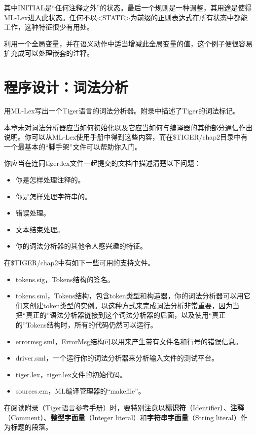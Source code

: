 \documentclass[cn,11pt,chinese]{elegantbook}
\begin{document}
其中INITIAL是“任何注释之外”的状态。最后一个规则是一种调整，其用途是使得ML-Lex进入此状态。任何不以<STATE>为前缀的正则表达式在所有状态中都能工作，这种特征很少有用处。

利用一个全局变量，并在语义动作中适当增减此全局变量的值，这个例子便很容易扩充成可以处理嵌套的注释。

\section{程序设计：词法分析}

用ML-Lex写出一个Tiger语言的词法分析器。附录中描述了Tiger的词法标记。

本章未对词法分析器应当如何初始化以及它应当如何与编译器的其他部分通信作出说明。你可以从ML-Lex使用手册中得到这些内容，而在\$TIGER/chap2目录中有一个最基本的“脚手架”文件可以帮助你入门。

你应当在连同tiger.lex文件一起提交的文档中描述清楚以下问题：

\begin{itemize}
  \item 你是怎样处理注释的。
  \item 你是怎样处理字符串的。
  \item 错误处理。
  \item 文本结束处理。
  \item 你的词法分析器的其他令人感兴趣的特征。
\end{itemize}

在\$TIGER/chap2中有如下一些可用的支持文件。

\begin{itemize}
  \item tokens.sig，Tokens结构的签名。
  \item tokens.sml，Tokens结构，包含token类型和构造器，你的词法分析器可以用它们来创建token类型的实例。以这种方式来完成词法分析非常重要，因为当把“真正的”语法分析器链接到这个词法分析器的后面，以及使用“真正的”Tokens结构时，所有的代码仍然可以运行。
  \item errormsg.sml，ErrorMsg结构可以用来产生带有文件名和行号的错误信息。
  \item driver.sml，一个运行你的词法分析器来分析输入文件的测试平台。
  \item tiger.lex，tiger.lex文件的初始代码。
  \item sources.cm，ML编译管理器的“makefile”。
\end{itemize}

在阅读附录（Tiger语言参考手册）时，要特别注意以\textbf{标识符}（Identifier）、\textbf{注释}（Comment）、\textbf{整型字面量}（Integer literal）和\textbf{字符串字面量}（String literal）作为标题的段落。
\end{document}
